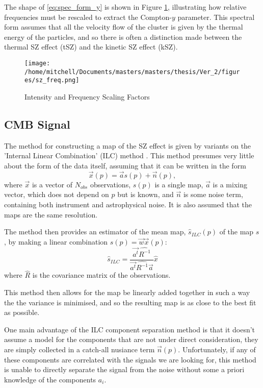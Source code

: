 The shape of \eqref{eq:spec_form_y} is shown in Figure \ref{fig:sz}, illustrating how relative frequencies must be rescaled to extract the Compton-$y$ parameter. This spectral form assumes that all the velocity flow of the cluster is given by the thermal energy of the particles, and so there is often a distinction made between the thermal SZ effect (tSZ) and the kinetic SZ effect (kSZ). 
\begin{figure}[h!]
\centering
\texttt{[image: /home/mitchell/Documents/masters/masters/thesis/Ver\_2/figures/sz\_freq.png]}
\caption{\sze Intensity and Frequency Scaling Factors}
\label{fig:sz}
\end{figure}

\subsection{CMB Signal}

The method for constructing a map of the SZ effect is given by variants on the 'Internal Linear Combination' (ILC) method \citep{2011MNRAS.410.2481R}. This method presumes very little about the form of the data itself, assuming that it can be written in the form 
\begin{equation}
\vec{x}(p) = \vec{a} s(p) + \vec{n}(p),
\label{eq:ilc_1}
\end{equation}
where $\vec{x}$ is a vector of $N_{obs}$ observations, $s(p)$ is a single map, $\vec{a}$ is a mixing vector, which does not depend on $p$ but is known, and $\vec{n}$ is some noise term, containing both instrument and astrophysical noise. It is also assumed that the maps are the same resolution.

The method then provides an estimator of the mean map, $\hat{s}_{ILC}(p)$ of the map $s$, by making a linear combination $\hat{s}(p) = \vec{w} \vec{x}(p)$:
\begin{equation}
\hat{s}_{ILC} = \frac{\vec{a^t} \hat{R^{-1}}}{\vec{a^t} \hat{R^{-1}} \vec{a}} \hat{x}
\end{equation}
where $\hat{R}$ is the covariance matrix of the observations. 

This method then allows for the map be linearly added together in such a way the the variance is minimised, and so the resulting map is as close to the best fit as possible. 
\par One main advantage of the ILC component separation method is that it doesn't assume a model for the components that are not under direct consideration, they are simply collected in a catch-all nusiance term $\vec{n}(p)$. Unfortunately, if any of these components are correlated with the signals we are looking for, this method is unable to directly separate the signal from the noise without some a priori knowledge of the components $a_i$.

